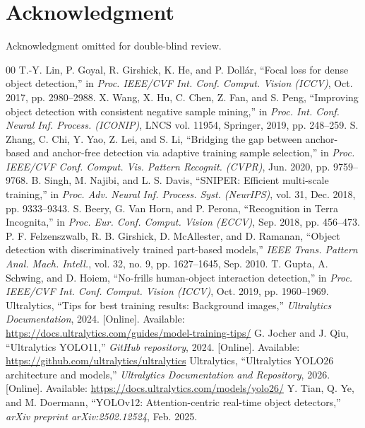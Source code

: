 \documentclass[conference]{IEEEtran}
\begin{document}
\section*{Acknowledgment}
Acknowledgment omitted for double-blind review.

\begin{thebibliography}{00}
\setlength{\itemsep}{0.6pt}
\setlength{\parskip}{0pt}
T.-Y. Lin, P. Goyal, R. Girshick, K. He, and P. Doll\'{a}r,
``Focal loss for dense object detection,''
in \textit{Proc. IEEE/CVF Int. Conf. Comput. Vision (ICCV)}, Oct. 2017, pp. 2980--2988.
X. Wang, X. Hu, C. Chen, Z. Fan, and S. Peng,
``Improving object detection with consistent negative sample mining,''
in \textit{Proc. Int. Conf. Neural Inf. Process. (ICONIP)}, LNCS vol. 11954, Springer, 2019, pp. 248--259.
S. Zhang, C. Chi, Y. Yao, Z. Lei, and S. Li,
``Bridging the gap between anchor-based and anchor-free detection via adaptive training sample selection,''
in \textit{Proc. IEEE/CVF Conf. Comput. Vis. Pattern Recognit. (CVPR)}, Jun. 2020, pp. 9759--9768.
B. Singh, M. Najibi, and L. S. Davis,
``SNIPER: Efficient multi-scale training,''
in \textit{Proc. Adv. Neural Inf. Process. Syst. (NeurIPS)}, vol. 31, Dec. 2018, pp. 9333--9343.
S. Beery, G. Van Horn, and P. Perona,
``Recognition in Terra Incognita,''
in \textit{Proc. Eur. Conf. Comput. Vision (ECCV)}, Sep. 2018, pp. 456--473.
P. F. Felzenszwalb, R. B. Girshick, D. McAllester, and D. Ramanan,
``Object detection with discriminatively trained part-based models,''
\textit{IEEE Trans. Pattern Anal. Mach. Intell.}, vol. 32, no. 9, pp. 1627--1645, Sep. 2010.
T. Gupta, A. Schwing, and D. Hoiem,
``No-frills human-object interaction detection,''
in \textit{Proc. IEEE/CVF Int. Conf. Comput. Vision (ICCV)}, Oct. 2019, pp. 1960--1969.
Ultralytics,
``Tips for best training results: Background images,''
\textit{Ultralytics Documentation}, 2024. [Online]. Available: \url{https://docs.ultralytics.com/guides/model-training-tips/}
G. Jocher and J. Qiu,
``Ultralytics YOLO11,''
\textit{GitHub repository}, 2024. [Online]. Available: \url{https://github.com/ultralytics/ultralytics}
Ultralytics,
``Ultralytics YOLO26 architecture and models,''
\textit{Ultralytics Documentation and Repository}, 2026. [Online]. Available: \url{https://docs.ultralytics.com/models/yolo26/}
Y. Tian, Q. Ye, and M. Doermann,
``YOLOv12: Attention-centric real-time object detectors,''
\textit{arXiv preprint arXiv:2502.12524}, Feb. 2025.

\end{thebibliography}
\end{document}
